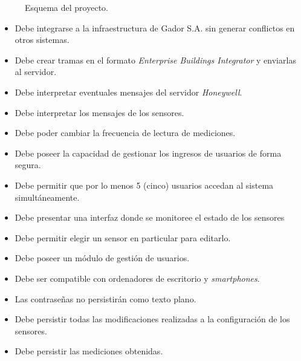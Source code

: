 \begin{figure}[h]
	\centering
	\caption{Esquema del proyecto.}
	\label{fig:esquemaProyecto}
\end{figure}
	
\begin{itemize}
	\item Debe integrarse a la infraestructura de Gador S.A. sin generar conflictos en otros sistemas.
	\item Debe crear tramas en el formato \emph{Enterprise Buildings Integrator} y enviarlas al servidor.
	\item Debe interpretar eventuales mensajes del servidor \emph{Honeywell}.
	\item Debe interpretar los mensajes de los sensores.
	\item Debe poder cambiar la frecuencia de lectura de mediciones.
	\item Debe poseer la capacidad de gestionar los ingresos de usuarios de forma segura.
	\item Debe permitir que por lo menos 5 (cinco) usuarios accedan al sistema simultáneamente.
	\item Debe presentar una interfaz donde se monitoree el estado de los sensores
	\item Debe permitir elegir un sensor en particular para editarlo.
	\item Debe poseer un módulo de gestión de usuarios.
	\item Debe ser compatible con ordenadores de escritorio y \emph{smartphones}.
	\item Las contraseñas no persistirán como texto plano.
	\item Debe persistir todas las modificaciones realizadas a la configuración de los sensores.
	\item Debe persistir las mediciones obtenidas.
\end{itemize}